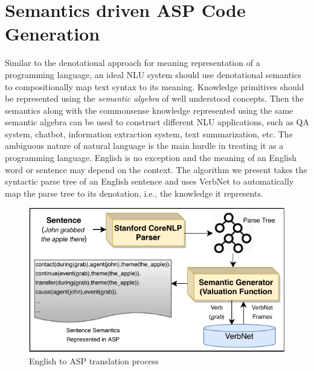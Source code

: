 \documentclass[letterpaper]{article}
\begin{document}
\section{Semantics driven ASP Code Generation}
Similar to the denotational approach for meaning representation of a programming language, an ideal NLU system should use denotational semantics to compositionally map text syntax to its meaning. Knowledge primitives should be represented using the \textit{semantic algebra} \cite{d_semantics} of  well understood concepts. Then the semantics along with the commonsense knowledge represented using the same semantic algebra can be used to construct different NLU applications, such as QA system, chatbot, information extraction system, text summarization, etc. The ambiguous nature of natural language is the main hurdle in treating it as a programming language. English is no exception and the meaning of an English word or sentence may depend on the context. The algorithm we present takes the syntactic parse tree of an English sentence and uses VerbNet to automatically map the parse tree to its denotation, i.e., the knowledge it represents.




\begin{figure}[h]
\centering
\includegraphics[scale = 0.8]{semantic_algebra}
\caption{English to ASP translation process }
\label{fig:semantic_algebra}
\end{figure}
\end{document}
